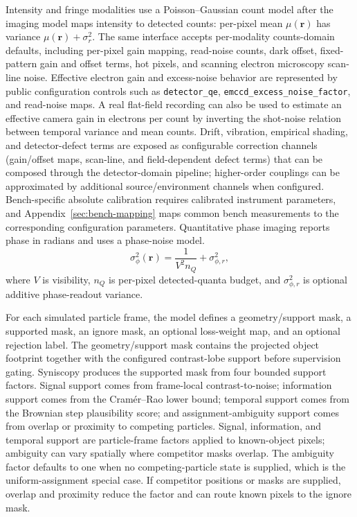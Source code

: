 Intensity and fringe modalities use a Poisson--Gaussian count model after the imaging model maps intensity to detected counts: per-pixel mean $\mu(\mathbf{r})$ has variance $\mu(\mathbf{r})+\sigma_r^2$. The same interface accepts per-modality counts-domain defaults, including per-pixel gain mapping, read-noise counts, dark offset, fixed-pattern gain and offset terms, hot pixels, and scanning electron microscopy scan-line noise. Effective electron gain and excess-noise behavior are represented by public configuration controls such as \texttt{detector\_qe}, \texttt{emccd\_excess\_noise\_factor}, and read-noise maps. A real flat-field recording can also be used to estimate an effective camera gain in electrons per count by inverting the shot-noise relation between temporal variance and mean counts. Drift, vibration, empirical shading, and detector-defect terms are exposed as configurable correction channels (gain/offset maps, scan-line, and field-dependent defect terms) that can be composed through the detector-domain pipeline; higher-order couplings can be approximated by additional source/environment channels when configured. Bench-specific absolute calibration requires calibrated instrument parameters, and Appendix~\ref{sec:bench-mapping} maps common bench measurements to the corresponding configuration parameters. Quantitative phase imaging reports phase in radians and uses a phase-noise model.
\begin{equation}
  \sigma_\phi^2(\mathbf{r}) = \frac{1}{V^2 n_Q} + \sigma_{\phi,r}^2 ,
\end{equation}
where $V$ is visibility, $n_Q$ is per-pixel detected-quanta budget, and $\sigma_{\phi,r}^2$ is optional additive phase-readout variance.

For each simulated particle frame, the model defines a geometry/support mask, a supported mask, an ignore mask, an optional loss-weight map, and an optional rejection label. The geometry/support mask contains the projected object footprint together with the configured contrast-lobe support before supervision gating. Syniscopy produces the supported mask from four bounded support factors. Signal support comes from frame-local contrast-to-noise; information support comes from the Cram\'{e}r--Rao lower bound; temporal support comes from the Brownian step plausibility score; and assignment-ambiguity support comes from overlap or proximity to competing particles. Signal, information, and temporal support are particle-frame factors applied to known-object pixels; ambiguity can vary spatially where competitor masks overlap. The ambiguity factor defaults to one when no competing-particle state is supplied, which is the uniform-assignment special case. If competitor positions or masks are supplied, overlap and proximity reduce the factor and can route known pixels to the ignore mask.

